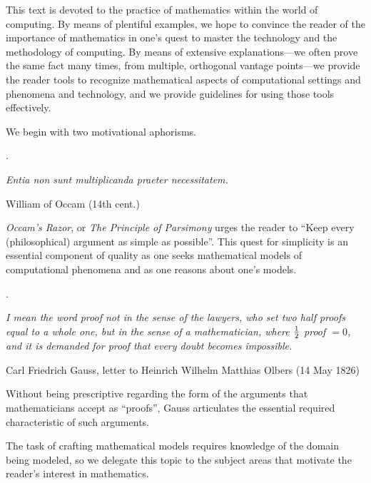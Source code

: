This text is devoted to the practice of mathematics within the world
of computing.  By means of plentiful examples, we hope to convince the
reader of the importance of mathematics in one's quest to master the
technology and the methodology of computing.  By means of extensive
explanations---we often prove the same fact many times, from multiple,
orthogonal vantage points---we provide the reader tools to recognize
mathematical aspects of computational settings and phenomena and
technology, and we provide guidelines for using those tools
effectively.

We begin with two motivational aphorisms.

\medskip

.


\noindent
{\it Entia non sunt multiplicanda praeter necessitatem.}

\hfill {\small William of Occam (14th cent.)} 

\smallskip

\noindent
{\it Occam's Razor}, or {\it The Principle of Parsimony} urges the
reader to ``Keep every (philosophical) argument as simple as
possible''.  This quest for simplicity is an essential component of
quality as one seeks mathematical models of computational phenomena
and as one reasons about one's models.

\medskip

.

\noindent
{\it I mean the word proof not in the sense of the lawyers, who set
  two half proofs equal to a whole one, but in the sense of a
  mathematician, where ${1 \over 2}$ proof $= 0$, and it is demanded
  for proof that every doubt becomes impossible.}

\hfill {\small Carl Friedrich Gauss,
  letter to Heinrich Wilhelm Matthias Olbers (14 May 1826)}

\smallskip

\noindent
Without being prescriptive regarding the form of the arguments that
mathematicians accept as ``proofs'', Gauss articulates the essential
required characteristic of such arguments.

\bigskip

The task of crafting mathematical models requires knowledge of the
domain being modeled, so we delegate this topic to the subject areas
that motivate the reader's interest in mathematics.

